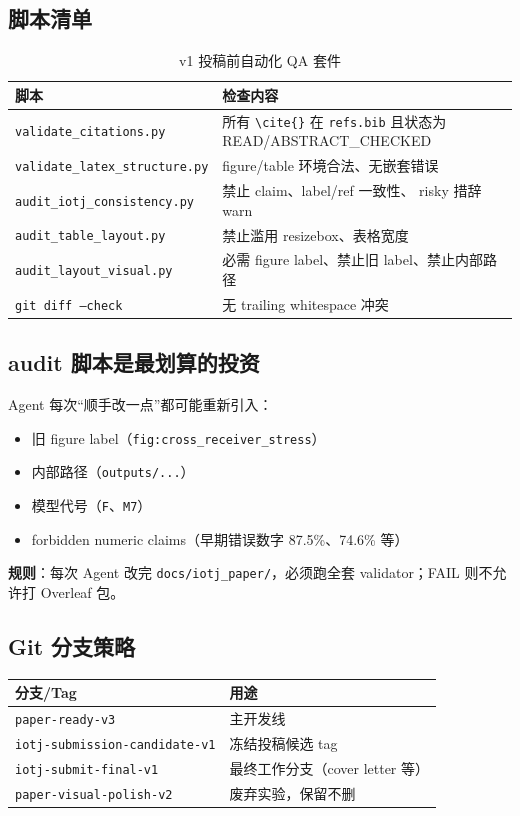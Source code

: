 \documentclass[11pt,a4paper]{ctexart}
\newcommand{\paperdir}{\texttt{docs/iotj\_paper/}}
\begin{document}
\subsection{脚本清单}
\begin{table}[htbp]
  \centering
  \small
  \begin{tabular}{@{}ll@{}}
    \toprule
    \textbf{脚本} & \textbf{检查内容} \\
    \midrule
    \texttt{validate\_citations.py} & 所有 \texttt{\textbackslash cite\{\}} 在 \texttt{refs.bib} 且状态为 READ/ABSTRACT\_CHECKED \\
    \texttt{validate\_latex\_structure.py} & figure/table 环境合法、无嵌套错误 \\
    \texttt{audit\_iotj\_consistency.py} & 禁止 claim、label/ref 一致性、 risky 措辞 warn \\
    \texttt{audit\_table\_layout.py} & 禁止滥用 resizebox、表格宽度 \\
    \texttt{audit\_layout\_visual.py} & 必需 figure label、禁止旧 label、禁止内部路径 \\
    \texttt{git diff --check} & 无 trailing whitespace 冲突 \\
    \bottomrule
  \end{tabular}
  \caption{v1 投稿前自动化 QA 套件}
\end{table}

\subsection{audit 脚本是最划算的投资}
Agent 每次``顺手改一点''都可能重新引入：
\begin{itemize}
  \item 旧 figure label（\texttt{fig:cross\_receiver\_stress}）
  \item 内部路径（\texttt{outputs/...}）
  \item 模型代号（\texttt{F}、\texttt{M7}）
  \item forbidden numeric claims（早期错误数字 87.5\%、74.6\% 等）
\end{itemize}
\textbf{规则}：每次 Agent 改完 \paperdir{}，必须跑全套 validator；FAIL 则不允许打 Overleaf 包。

\subsection{Git 分支策略}
\begin{table}[htbp]
  \centering
  \small
  \begin{tabular}{@{}ll@{}}
    \toprule
    \textbf{分支/Tag} & \textbf{用途} \\
    \midrule
    \texttt{paper-ready-v3} & 主开发线 \\
    \texttt{iotj-submission-candidate-v1} & 冻结投稿候选 tag \\
    \texttt{iotj-submit-final-v1} & 最终工作分支（cover letter 等） \\
    \texttt{paper-visual-polish-v2} & 废弃实验，保留不删 \\
    \bottomrule
  \end{tabular}
\end{table}
\end{document}
